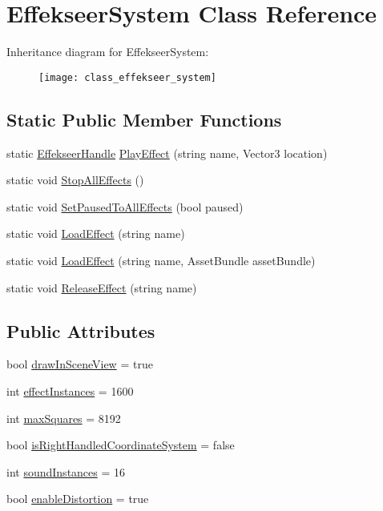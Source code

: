 \hypertarget{class_effekseer_system}{\section{Effekseer\-System Class Reference}
\label{class_effekseer_system}
}
Inheritance diagram for Effekseer\-System\-:\begin{figure}[H]
\begin{center}
\leavevmode
\texttt{[image: class\_effekseer\_system]}
\end{center}
\end{figure}
\subsection*{Static Public Member Functions}
\begin{DoxyCompactItemize}
\item 
static \hyperlink{struct_effekseer_handle}{Effekseer\-Handle} \hyperlink{class_effekseer_system_a8d0a7561a512b64acce39c4456ff6f37}{Play\-Effect} (string name, Vector3 location)
\item 
static void \hyperlink{class_effekseer_system_acf3dde4a65c0e99aeacfea71b517b541}{Stop\-All\-Effects} ()
\item 
static void \hyperlink{class_effekseer_system_af4e9eb30bd4a06ff5bc32b6ef0d020fe}{Set\-Paused\-To\-All\-Effects} (bool paused)
\item 
static void \hyperlink{class_effekseer_system_af4059b796725905982565d8b239bf9fa}{Load\-Effect} (string name)
\item 
static void \hyperlink{class_effekseer_system_a4f7d874f76c4f354b70b852df590be72}{Load\-Effect} (string name, Asset\-Bundle asset\-Bundle)
\item 
static void \hyperlink{class_effekseer_system_a8b328c83692b922217657a21f9d5fdeb}{Release\-Effect} (string name)
\end{DoxyCompactItemize}
\subsection*{Public Attributes}
\begin{DoxyCompactItemize}
\item 
bool \hyperlink{class_effekseer_system_a469cf59d9deeaef6e27b15c5fc5ee524}{draw\-In\-Scene\-View} = true
\item 
int \hyperlink{class_effekseer_system_a0516609db2194d83016f439b93510f21}{effect\-Instances} = 1600
\item 
int \hyperlink{class_effekseer_system_a2007e297eab6bc504cce40650679b1c4}{max\-Squares} = 8192
\item 
bool \hyperlink{class_effekseer_system_a106a9e679535bdacd968ab94c421321e}{is\-Right\-Handled\-Coordinate\-System} = false
\item 
int \hyperlink{class_effekseer_system_ac83155c54d94fc6b61f6f53032923667}{sound\-Instances} = 16
\item 
bool \hyperlink{class_effekseer_system_ad8a639d37912d6a3ada4ba5a065a7493}{enable\-Distortion} = true
\end{DoxyCompactItemize}
